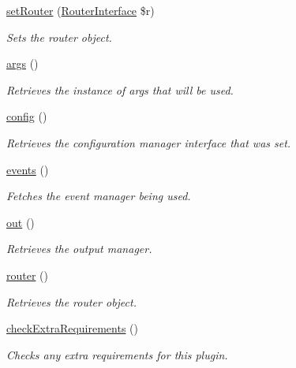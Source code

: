 \begin{DoxyCompactItemize}
\hyperlink{classGenericPlugin_ac03553d95ea0e2d5023e3f78ef85f4b9}{set\-Router} (\hyperlink{interfaceRouterInterface}{Router\-Interface} \$r)
\begin{DoxyCompactList}\small\item\em Sets the router object. \end{DoxyCompactList}\item 
\hyperlink{classGenericPlugin_a1ce2fea9e153e37e019ff4b72fd3b819}{args} ()
\begin{DoxyCompactList}\small\item\em Retrieves the instance of args that will be used. \end{DoxyCompactList}\item 
\hyperlink{classGenericPlugin_aa7c4a335f37ee83cd131be29ed469c82}{config} ()
\begin{DoxyCompactList}\small\item\em Retrieves the configuration manager interface that was set. \end{DoxyCompactList}\item 
\hyperlink{classGenericPlugin_ab7d46f8bdaf1540eee1b988073294298}{events} ()
\begin{DoxyCompactList}\small\item\em Fetches the event manager being used. \end{DoxyCompactList}\item 
\hyperlink{classGenericPlugin_a005937e2c819abbb56fdc4b10fdeb666}{out} ()
\begin{DoxyCompactList}\small\item\em Retrieves the output manager. \end{DoxyCompactList}\item 
\hyperlink{classGenericPlugin_adc6c23c436e9979ed2c5b07dde6f3931}{router} ()
\begin{DoxyCompactList}\small\item\em Retrieves the router object. \end{DoxyCompactList}\item 
\hyperlink{classGenericPlugin_a53983a917eccd1ee4b06355f688c0960}{check\-Extra\-Requirements} ()
\begin{DoxyCompactList}\small\item\em Checks any extra requirements for this plugin. \end{DoxyCompactList}\end{DoxyCompactItemize}
